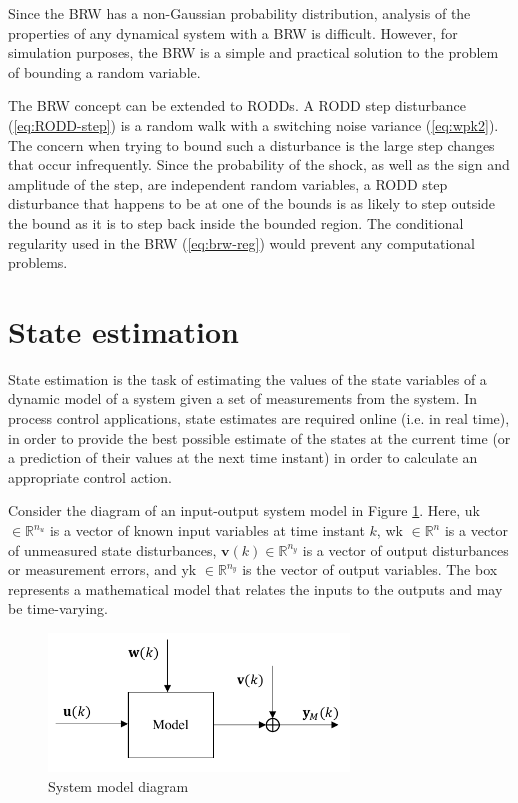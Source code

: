 Since the \gls{BRW} has a non-Gaussian probability distribution, analysis of the properties of any dynamical system with a \gls{BRW} is difficult. However, for simulation purposes, the \gls{BRW} is a simple and practical solution to the problem of bounding a random variable.

The \gls{BRW} concept can be extended to \gls{RODD}s. A \gls{RODD} step disturbance (\ref{eq:RODD-step}) is a random walk with a switching noise variance (\ref{eq:wpk2}). The concern when trying to bound such a disturbance is the large step changes that occur infrequently. Since the probability of the shock, as well as the sign and amplitude of the step, are independent random variables, a \gls{RODD} step disturbance that happens to be at one of the bounds is as likely to step outside the bound as it is to step back inside the bounded region. The conditional regularity used in the \gls{BRW} (\ref{eq:brw-reg}) would prevent any computational problems. 



\section{State estimation}

State estimation is the task of estimating the values of the state variables of a dynamic model of a system given a set of measurements from the system. In process control applications, state estimates are required online (i.e. in real time), in order to provide the best possible estimate of the states at the current time (or a prediction of their values at the next time instant) in order to calculate an appropriate control action.

Consider the diagram of an input-output system model in Figure \ref{fig:model_diag_uwvy}. Here, \gls{uk} $\in \mathbb{R}^{n_u}$ is a vector of known input variables at time instant $k$, \gls{wk} $\in \mathbb{R}^n$ is a vector of unmeasured state disturbances, $\mathbf{v}(k) \in \mathbb{R}^{n_y}$ is a vector of output disturbances or measurement errors, and \gls{yk} $\in \mathbb{R}^{n_y}$ is the vector of output variables. The box represents a mathematical model that relates the inputs to the outputs and may be time-varying. 
\begin{figure}[htp]
	\centering
	\includegraphics[width=8cm]{images/model_diag_uwvy.pdf}
	\caption{System model diagram}
	\label{fig:model_diag_uwvy}
\end{figure}

